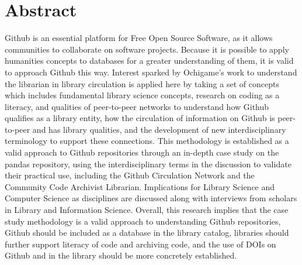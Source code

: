 \chapter*{Abstract} 

Github is an essential platform for Free Open Source Software, as it allows communities to collaborate on software projects. Because it is possible to apply humanities concepts to databases for a greater understanding of them, it is valid to approach Github this way. Interest sparked by Ochigame’s work to understand the librarian in library circulation is applied here by taking a set of concepts which includes fundamental library science concepts, research on coding as a literacy, and qualities of peer-to-peer networks to understand how Github qualifies as a library entity, how the circulation of information on Github is peer-to-peer and has library qualities, and the development of new interdisciplinary terminology to support these connections. This methodology is established as a valid approach to Github repositories through an in-depth case study on the pandas repository, using the interdisciplinary terms in the discussion to validate their practical use, including the Github Circulation Network and the Community Code Archivist Librarian. Implications for Library Science and Computer Science as disciplines are discussed along with interviews from scholars in Library and Information Science. Overall, this research implies that the case study methodology is a valid approach to understanding Github repositories, Github should be included as a database in the library catalog, libraries should further support literacy of code and archiving code, and the use of DOIs on Github and in the library should be more concretely established. 
